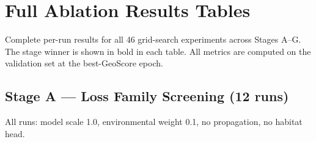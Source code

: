 \section{Full Ablation Results Tables}
\label{sec:B-full-ablation-results-tables}

Complete per-run results for all 46 grid-search experiments across Stages A--G. The stage winner is shown in bold in each table. All metrics are computed on the validation set at the best-GeoScore epoch.

\subsection{Stage A --- Loss Family Screening (12 runs)}
\label{sec:B-1-stage-a-loss-family-screening-12-runs}

All runs: model scale 1.0, environmental weight 0.1, no propagation, no habitat head.

